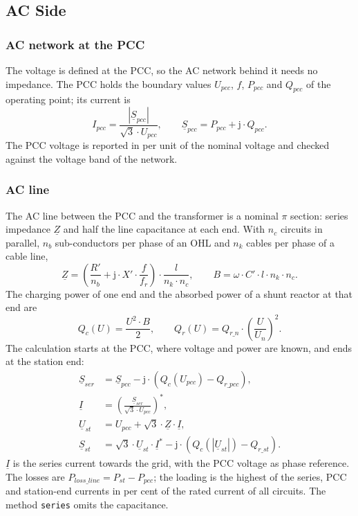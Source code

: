 \subsection{AC Side}
\label{sec:station-ac}

\subsubsection{AC network at the PCC}

The voltage is defined at the PCC, so the AC network behind it needs no impedance. The PCC holds the boundary
values $U_{pcc}$, $f$, $P_{pcc}$ and $Q_{pcc}$ of the operating point; its current is
\begin{equation}
  I_{pcc} = \frac{\left| \underline{S}_{pcc} \right|}{\sqrt{3} \cdot U_{pcc}} ,
  \qquad \underline{S}_{pcc} = P_{pcc} + \mathrm{j} \cdot Q_{pcc} .
\end{equation}
The PCC voltage is reported in per unit of the nominal voltage and checked against the voltage band of the network.

\subsubsection{AC line}

The AC line between the PCC and the transformer is a nominal $\pi$ section: series impedance $\underline{Z}$ and
half the line capacitance at each end. With $n_c$ circuits in parallel, $n_b$ sub-conductors per phase of an OHL
and $n_k$ cables per phase of a cable line,
\begin{equation}
  \underline{Z} = \left( \frac{R'}{n_b} + \mathrm{j} \cdot X' \cdot \frac{f}{f_r} \right) \cdot \frac{l}{n_k \cdot n_c} ,
  \qquad B = \omega \cdot C' \cdot l \cdot n_k \cdot n_c .
\end{equation}
The charging power of one end and the absorbed power of a shunt reactor at that end are
\begin{equation}
  Q_c(U) = \frac{U^2 \cdot B}{2} , \qquad Q_r(U) = Q_{r\_n} \cdot \left( \frac{U}{U_n} \right)^2 .
\end{equation}
The calculation starts at the PCC, where voltage and power are known, and ends at the station end:
\begin{align}
  \underline{S}_{ser} &= \underline{S}_{pcc} - \mathrm{j} \cdot \left( Q_c(U_{pcc}) - Q_{r\_pcc} \right) , \\
  \underline{I} &= \left( \frac{\underline{S}_{ser}}{\sqrt{3} \cdot U_{pcc}} \right)^{*} , \\
  \underline{U}_{st} &= U_{pcc} + \sqrt{3} \cdot \underline{Z} \cdot \underline{I} , \\
  \underline{S}_{st} &= \sqrt{3} \cdot \underline{U}_{st} \cdot \underline{I}^{*}
                        - \mathrm{j} \cdot \left( Q_c(|\underline{U}_{st}|) - Q_{r\_st} \right) .
\end{align}
$\underline{I}$ is the series current towards the grid, with the PCC voltage as phase reference. The losses are
$P_{loss\_line} = P_{st} - P_{pcc}$; the loading is the highest of the series, PCC and station-end currents in
per cent of the rated current of all circuits. The method \texttt{series} omits the capacitance.

